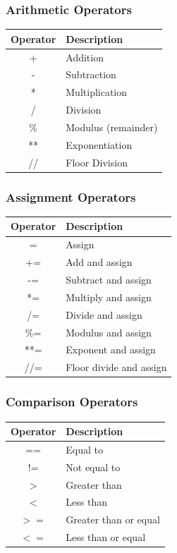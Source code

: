 \documentclass[aspectratio=169]{beamer}
\begin{document}
\begin{frame}
\frametitle{Arithmetic Operators}
\begin{center}
\begin{tabular}{|c|l|}
\hline
\textbf{Operator} & \textbf{Description} \\
\hline
+ & Addition \\
- & Subtraction \\
* & Multiplication \\
/ & Division \\
\% & Modulus (remainder) \\
** & Exponentiation \\
// & Floor Division \\
\hline
\end{tabular}
\end{center}
\end{frame}

\begin{frame}
\frametitle{Assignment Operators}
\begin{center}
\begin{tabular}{|c|l|}
\hline
\textbf{Operator} & \textbf{Description} \\
\hline
= & Assign \\
+= & Add and assign \\
-= & Subtract and assign \\
*= & Multiply and assign \\
/= & Divide and assign \\
\%= & Modulus and assign \\
**= & Exponent and assign \\
//= & Floor divide and assign \\
\hline
\end{tabular}
\end{center}
\end{frame}

\begin{frame}
\frametitle{Comparison Operators}
\begin{center}
\begin{tabular}{|c|l|}
\hline
\textbf{Operator} & \textbf{Description} \\
\hline
== & Equal to \\
!= & Not equal to \\
$>$ & Greater than \\
$<$ & Less than \\
$>=$ & Greater than or equal \\
$<=$ & Less than or equal \\
\hline
\end{tabular}
\end{center}
\end{frame}
\end{document}
